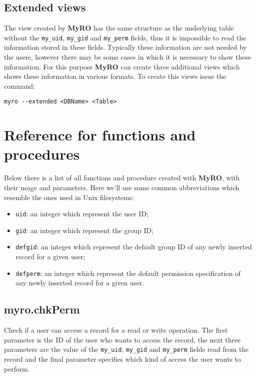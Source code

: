 \documentclass[12pt,titlepage]{article}
\newcommand{\myro}{\textbf{MyRO} }
\newcommand{\myrO}{\textbf{MyRO}}
\begin{document}
\subsection{Extended views}
The view created by \myro has the same structure as the underlying
table without the \verb|my_uid|, \verb|my_gid| and \verb|my_perm|
fields, thus it is impossible to read the information stored in these
fields. Typically these information are not needed by the users, however
there may be some cases in which it is necessary to show these
information. For this purpose \myro can create three additional views
which shows these information in various formats. To create this
views issue the command:
%
\begin{verbatim}
myro --extended <DBName> <Table>
\end{verbatim}


\newpage
\section{Reference for functions and procedures}
Below there is a list of all functions and procedure created with
\myrO, with their usage and parameters. Here we'll use some common
abbreviations which resemble the ones used in Unix filesystems:

\begin{itemize}
\item \verb|uid|: an integer which represent the user ID;
\item \verb|gid|: an integer which represent the group ID;
\item \verb|defgid|: an integer which represent the default group ID
  of any newly inserted record for a given user;
\item \verb|defperm|: an integer which represent the default
  permission specification of any newly inserted record for a given
  user.
\end{itemize}



\subsection{myro.chkPerm}
Check if a user can access a record for a read or write operation. The
first parameter is the ID of the user who wants to access the
record, the next three parameters are the value of the \verb|my_uid|,
\verb|my_gid| and \verb|my_perm| fields read from the record and the
final parameter specifies which kind of access the user wants to
perform.
\end{document}
